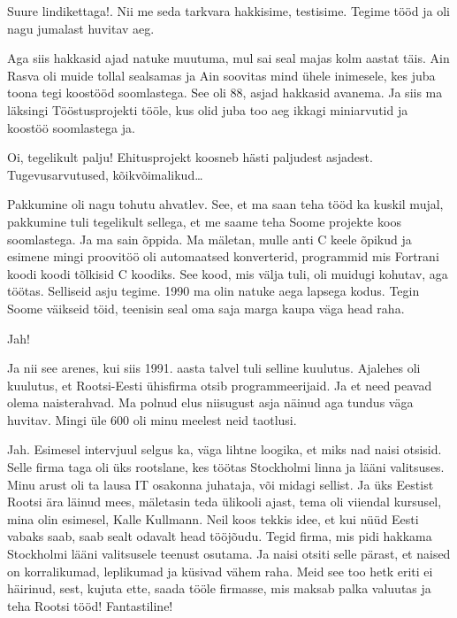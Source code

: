 
Suure lindikettaga!. Nii me seda tarkvara hakkisime, testisime. Tegime tööd ja 
oli nagu jumalast huvitav aeg.

Aga siis hakkasid ajad natuke muutuma, mul sai seal majas kolm aastat täis. Ain 
Rasva oli muide tollal sealsamas ja Ain soovitas mind 
ühele inimesele, kes juba toona tegi koostööd soomlastega. See oli 88, asjad 
hakkasid avanema. Ja siis ma läksingi Tööstusprojekti 
tööle, kus  olid juba too aeg ikkagi miniarvutid ja koostöö soomlastega ja. 


Oi, tegelikult palju! Ehitusprojekt koosneb  hästi paljudest asjadest. 
Tugevusarvutused, kõikvõimalikud\ldots 


Pakkumine oli nagu tohutu ahvatlev. See, et ma saan teha tööd ka kuskil mujal, 
pakkumine tuli tegelikult sellega, et me saame teha Soome projekte koos 
soomlastega. Ja ma sain õppida. Ma mäletan, mulle anti C keele õpikud ja 
esimene mingi proovitöö oli automaatsed konverterid,  programmid mis  
Fortrani koodi koodi tõlkisid C koodiks. See kood, mis 
välja tuli, oli muidugi kohutav, aga töötas. Selliseid asju tegime. 1990 ma 
olin natuke aega lapsega kodus. Tegin Soome väikseid töid, teenisin seal oma 
saja marga kaupa  väga head raha. 


Jah!

Ja nii see arenes, kui siis 1991. aasta talvel tuli selline kuulutus. Ajalehes 
oli kuulutus, et Rootsi-Eesti ühisfirma otsib programmeerijaid. Ja et need 
peavad olema naisterahvad. Ma polnud elus niisugust asja näinud aga tundus väga 
huvitav. Mingi üle 600 oli minu meelest neid taotlusi. 


Jah. Esimesel intervjuul selgus ka, väga lihtne loogika, et miks nad naisi 
otsisid. Selle firma taga oli üks rootslane, kes töötas Stockholmi linna ja 
lääni valitsuses. Minu arust oli ta lausa IT osakonna juhataja, või midagi 
sellist. Ja  üks Eestist Rootsi ära läinud mees, mäletasin teda ülikooli ajast, 
tema oli viiendal kursusel, mina olin esimesel, Kalle 
Kullmann. Neil koos tekkis idee, et kui nüüd Eesti 
vabaks saab, saab sealt odavalt head tööjõudu. Tegid firma, mis pidi hakkama 
Stockholmi lääni valitsusele teenust osutama. Ja naisi otsiti selle pärast, et 
naised on korralikumad, leplikumad ja küsivad vähem raha. Meid see too hetk 
eriti ei häirinud, sest, kujuta ette, saada tööle firmasse, mis maksab palka 
valuutas ja teha Rootsi tööd! Fantastiline!



